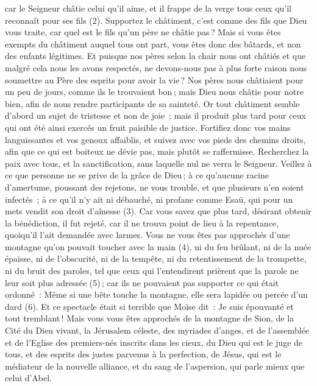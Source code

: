 \begin{multicols}{2}
car le Seigneur châtie celui qu'il aime, et il frappe de la verge tous ceux qu’il reconnaît pour ses fils (2).
Supportez le châtiment, c’est comme des fils que Dieu vous traite, car quel est le fils qu’un père ne châtie pas ?
Mais si vous êtes exempts du châtiment auquel tous ont part, vous êtes donc des bâtards, et non des enfants légitimes.
Et puisque nos pères selon la chair nous ont châtiés et que malgré cela nous les avons respectés, ne devons-nous pas à plus forte raison nous soumettre au Père des esprits pour avoir la vie ?
Nos pères nous châtiaient pour un peu de jours, comme ils le trouvaient bon ; mais Dieu nous châtie pour notre bien, afin de nous rendre participants de sa sainteté.
Or tout châtiment semble d’abord un sujet de tristesse et non de joie ; mais il produit plus tard pour ceux qui ont été ainsi exercés un fruit paisible de justice.
Fortifiez donc vos mains languissantes et vos genoux affaiblis,
et suivez avec vos pieds des chemins droits, afin que ce qui est boiteux ne dévie pas, mais plutôt se raffermisse.
Recherchez la paix avec tous, et la sanctification, sans laquelle nul ne verra le Seigneur.
Veillez à ce que personne ne se prive de la grâce de Dieu ; à ce qu’aucune racine d'amertume, poussant des rejetons, ne vous trouble, et que plusieurs n’en soient infectés ;
à ce qu’il n’y ait ni débauché, ni profane comme Esaü, qui pour un mets vendit son droit d’aînesse (3).
Car vous savez que plus tard, désirant obtenir la bénédiction, il fut rejeté, car il ne trouva point de lieu à la repentance, quoiqu'il l’ait demandée avec larmes.
Vous ne vous êtes pas approchés d’une montagne qu’on pouvait toucher avec la main (4), ni du feu brûlant, ni de la nuée épaisse, ni de l'obscurité, ni de la tempête,
ni du retentissement de la trompette, ni du bruit des paroles, tel que ceux qui l'entendirent prièrent que la parole ne leur soit plus adressée (5) ;
car ils ne pouvaient pas supporter ce qui était ordonné : Même si une bête touche la montagne, elle sera lapidée ou percée d'un dard (6).
Et ce spectacle était si terrible que Moïse dit : Je suis épouvanté et tout tremblant !
Mais vous vous êtes approchés de la montagne de Sion, de la Cité du Dieu vivant, la Jérusalem céleste, des myriades d'anges,
et de l'assemblée et de l'Eglise des premiers-nés inscrits dans les cieux, du Dieu qui est le juge de tous, et des esprits des justes parvenus à la perfection,
de Jésus, qui est le médiateur de la nouvelle alliance, et du sang de l'aspersion, qui parle mieux que celui d'Abel.

\end{multicols}
